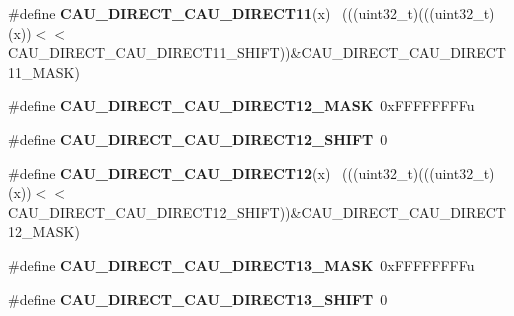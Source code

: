 \begin{DoxyCompactItemize}
\item 
\hypertarget{group___c_a_u___register___masks_ga06310f102802d8649fd3a552f2109203}{}\#define {\bfseries C\+A\+U\+\_\+\+D\+I\+R\+E\+C\+T\+\_\+\+C\+A\+U\+\_\+\+D\+I\+R\+E\+C\+T11}(x)                          ~(((uint32\+\_\+t)(((uint32\+\_\+t)(x))$<$$<$C\+A\+U\+\_\+\+D\+I\+R\+E\+C\+T\+\_\+\+C\+A\+U\+\_\+\+D\+I\+R\+E\+C\+T11\+\_\+\+S\+H\+I\+F\+T))\&C\+A\+U\+\_\+\+D\+I\+R\+E\+C\+T\+\_\+\+C\+A\+U\+\_\+\+D\+I\+R\+E\+C\+T11\+\_\+\+M\+A\+S\+K)\label{group___c_a_u___register___masks_ga06310f102802d8649fd3a552f2109203}

\item 
\hypertarget{group___c_a_u___register___masks_gaa2ee16a89961959b8a4a936d5f6ce49c}{}\#define {\bfseries C\+A\+U\+\_\+\+D\+I\+R\+E\+C\+T\+\_\+\+C\+A\+U\+\_\+\+D\+I\+R\+E\+C\+T12\+\_\+\+M\+A\+S\+K}~0x\+F\+F\+F\+F\+F\+F\+F\+Fu\label{group___c_a_u___register___masks_gaa2ee16a89961959b8a4a936d5f6ce49c}

\item 
\hypertarget{group___c_a_u___register___masks_gaebc337b0562194197195ce07c9f4c7d0}{}\#define {\bfseries C\+A\+U\+\_\+\+D\+I\+R\+E\+C\+T\+\_\+\+C\+A\+U\+\_\+\+D\+I\+R\+E\+C\+T12\+\_\+\+S\+H\+I\+F\+T}~0\label{group___c_a_u___register___masks_gaebc337b0562194197195ce07c9f4c7d0}

\item 
\hypertarget{group___c_a_u___register___masks_ga9ecf908191bd122a7a4376dec4d3a1aa}{}\#define {\bfseries C\+A\+U\+\_\+\+D\+I\+R\+E\+C\+T\+\_\+\+C\+A\+U\+\_\+\+D\+I\+R\+E\+C\+T12}(x)                          ~(((uint32\+\_\+t)(((uint32\+\_\+t)(x))$<$$<$C\+A\+U\+\_\+\+D\+I\+R\+E\+C\+T\+\_\+\+C\+A\+U\+\_\+\+D\+I\+R\+E\+C\+T12\+\_\+\+S\+H\+I\+F\+T))\&C\+A\+U\+\_\+\+D\+I\+R\+E\+C\+T\+\_\+\+C\+A\+U\+\_\+\+D\+I\+R\+E\+C\+T12\+\_\+\+M\+A\+S\+K)\label{group___c_a_u___register___masks_ga9ecf908191bd122a7a4376dec4d3a1aa}

\item 
\hypertarget{group___c_a_u___register___masks_ga5735753e1d7d46e22b92d806218045b2}{}\#define {\bfseries C\+A\+U\+\_\+\+D\+I\+R\+E\+C\+T\+\_\+\+C\+A\+U\+\_\+\+D\+I\+R\+E\+C\+T13\+\_\+\+M\+A\+S\+K}~0x\+F\+F\+F\+F\+F\+F\+F\+Fu\label{group___c_a_u___register___masks_ga5735753e1d7d46e22b92d806218045b2}

\item 
\hypertarget{group___c_a_u___register___masks_ga941037be28db6fbd833f5202ad2f21a5}{}\#define {\bfseries C\+A\+U\+\_\+\+D\+I\+R\+E\+C\+T\+\_\+\+C\+A\+U\+\_\+\+D\+I\+R\+E\+C\+T13\+\_\+\+S\+H\+I\+F\+T}~0\label{group___c_a_u___register___masks_ga941037be28db6fbd833f5202ad2f21a5}


\end{DoxyCompactItemize}
